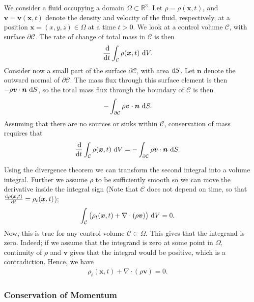 \documentclass[12pt]{article}
\begin{document}
We consider a fluid occupying a domain $\Omega \subset \mathbb{R}^3$. Let $\rho = \rho(\bm{x}, t)$, and
$\bm{v} = \bm{v}(\bm{x},t)$ denote the density and velocity of the fluid, respectively, at a position
$\bm{x} = (x,y,z) \in \Omega$ at a time $t > 0$. We look at a control volume $\mathcal{C}$, with surface $\partial \mathcal{C}$.
The rate of change of total mass in $\mathcal{C}$ is then
\begin{align}
    \frac{\operatorname{d}\!}{\operatorname{d}\! t}\int_\mathcal{C} \rho(\bm{x},t) \, \operatorname{d}\! V.
\end{align}
Consider now a small part of the surface $\partial \mathcal{C}$, with area $\operatorname{d}\! S$. Let $\bm{n}$ denote the outward normal
of $\partial \mathcal{C}$. The mass flux through this surface element is then $-\rho \bm{v} \cdot \bm{n} \, \operatorname{d}\! S$, so the
total mass flux through the boundary of $\mathcal{C}$ is then
\begin{align}
    -\int_{\partial \mathcal{C}}\rho \bm{v} \cdot \bm{n} \, \operatorname{d}\! S.
\end{align}
Assuming that there are no sources or sinks within $\mathcal{C}$, conservation of mass requires that
\begin{align}
    \frac{\operatorname{d}\!}{\operatorname{d}\! t}\int_\mathcal{C} \rho(\bm{x},t) \, \operatorname{d}\! V
                            = -\int_{\partial \mathcal{C}}\rho \bm{v} \cdot \bm{n} \, \operatorname{d}\! S.
\end{align}

Using the divergence theorem we can transform the second integral into
a volume integral. Further we assume $\rho$ to be sufficiently smooth
so we can move the derivative inside the integral sign (Note that
$\mathcal{C}$ does not depend on time, so that $\frac{\operatorname{d}\! \rho(\bm x,t)}{\operatorname{d}\!
  t}= \rho_t(\bm x, t)$);
\begin{align}
    \int_\mathcal{C} \big(\rho_t(\bm{x},t) + \nabla \cdot (\rho \bm{v}) \big) \, \operatorname{d}\! V = 0.
\end{align}
Now, this is true for any control volume $\mathcal{C} \subset \Omega$. This gives that the integrand is zero. Indeed;
if we assume that the integrand is zero at some point in $\Omega$, continuity of $\rho$ and $\bm{v}$
gives that the integral would be positive, which is a contradiction. Hence, we have
\begin{align}
    \rho_t(\bm{x},t) + \nabla \cdot (\rho \bm{v}) = 0.
\end{align}

%
%
\subsubsection*{Conservation of Momentum}
\end{document}
